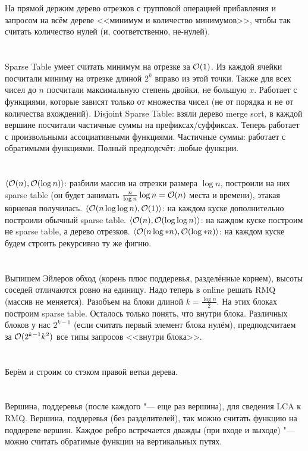 \section{} %
На прямой держим дерево отрезков с групповой операцией прибавления и запросом на всём дереве <<минимум и количество минимумов>>,
чтобы так считать количество нулей (и, соответственно, не-нулей).

\section{} %
Sparse Table умеет считать минимум на отрезке за $\mathcal{O}(1)$.
Из каждой ячейки посчитали миниму на отрезке длиной $2^k$ вправо из этой точки.
Также для всех чисел до $n$ посчитали максимальную степень двойки, не большую $x$.
Работает с функциями, которые зависят только от множества чисел (не от порядка и не от количества вхождений).
Disjoint Sparse Table: взяли дерево merge sort, в каждой вершине посчитали частичные суммы
на префиксах/суффиксах. Теперь работает с произвольными ассоциативными функциями.
Частичные суммы: работает с обратимыми функциями.
Полный предподсчёт: любые функции.

\section{} %
$\langle  \mathcal{O}(n), \mathcal{O}(\log n) \rangle$: разбили массив на отрезки размера $\log n$,
построили на них sparse table (он будет занимать $\frac{n}{\log n} \log n = \mathcal{O}(n)$ места и времени),
этакая корневая получилась.
$\langle \mathcal{O}(n \log \log n), \mathcal{O}(1) \rangle$: на каждом куске дополнительно построили обычный sparse table.
$\langle \mathcal{O}(n), \mathcal{O}(\log \log n) \rangle$: на каждом куске построим не sparse table, а дерево отрезков.
$\langle \mathcal{O}(n \log* n), \mathcal{O}(\log * n) \rangle$: на каждом куске будем строить рекурсивно ту же фигню.

\section{} %
Выпишем Эйлеров обход (корень плюс поддеревья, разделённые корнем), высоты соседей отличаются ровно на единицу.
Надо теперь в online решать RMQ (массив не меняется).
Разобъем на блоки длиной $k=\frac{\log n}{2}$.
На этих блоках построим sparse table.
Осталось только понять, что внутри блока.
Различных блоков у нас $2^{k-1}$ (если считать первый элемент блока нулём), предподсчитаем за $\mathcal{O}(2^{k-1}k^2)$ все типы запросов <<внутри блока>>.

\section{} %
Берём и строим со стэком правой ветки дерева.

\section{} %
Вершина, поддеревья (после каждого "--- еще раз вершина), для сведения LCA к RMQ.
Вершина, поддеревья (без разделителей), так можно считать функцию на поддереве вершин.
Каждое ребро встречается дважды (при входе и выходе) "--- можно считать обратимые функции на вертикальных путях.
